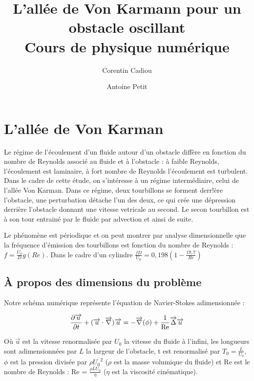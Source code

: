 
\title{L'allée de Von Karmann pour un obstacle oscillant\\
Cours de physique numérique}

\author{Corentin Cadiou \and Antoine Petit}
\date{}



\maketitle

\tableofcontents

\section{L'allée de Von Karman}
	
	Le régime de l'écoulement d'un fluide autour d'un obstacle diffère en fonction du nombre de Reynolds associé au fluide et à l'obstacle : à faible Reynolds, l'écoulement est laminaire, à fort nombre de Reynolds l'écoulement est turbulent. Dans le cadre de cette étude, on s'intéresse à un régime intermédiaire, celui de l'allée Von Karman. Dans ce régime, deux tourbillons se forment derr!ère l'obstacle, une perturbation détache l'un des deux, ce qui crée une dépression derrière l'obstacle donnant une vitesse vetricale au second. Le secon tourbillon est à son tour entrainé par le fluide par advection et ainsi de suite.
	
	
	Le phénomène est périodique et on peut montrer par analyse dimensionnelle que la fréquence d'émission des tourbillons est fonction du nombre de Reynolds : $f = \frac{U_0}{D}g(Re)$. Dans le cadre d'un cylindre $\frac{fD}{U_0}=0,198\left (1-\frac{19,7}{Re}\right )$ \cite{Von_Karman}
	
		\subsection{À propos des dimensions du problème}
	
		Notre schéma numérique représente l'équation de Navier-Stokes adimensionnée :

		\begin{equation}
			\frac{\partial \overrightarrow{u}}{\partial t} + (\overrightarrow{u} \cdot 	\overrightarrow{\nabla}) \overrightarrow{u} = - \overrightarrow{\nabla} (\phi) + \frac{1}{\mathrm{Re}} \overrightarrow{\Delta} \overrightarrow{u}
			\label{NS}
		\end{equation}
	
		Où $\overrightarrow{u}$ est la vitesse renormalisée par $U_0$ la vitesse du fluide à l'infini,
		les longueurs sont adimensionnées par $L$ la largeur de l'obstacle,
		t est renormalisé par $T_0 = \frac{L}{U_0}$,
		$\phi$ est la pression divisée par $\rho {U_0}^2$ ($\rho$ est la masse volumique du fluide)
		et Re est le nombre de Reynolds : Re = $\frac{\rho L U_0}{\eta}$ ($\eta$ est la viscosité cinématique).
	    
